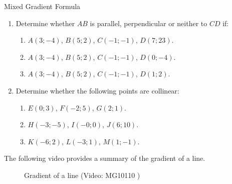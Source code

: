 \begin{exercises}{Mixed Gradient Formula}
 \begin{enumerate}
  \item Determine whether $AB$ is parallel, perpendicular or neither to $CD$ if:
  \begin{enumerate}
   \item $A(3;-4)$, $B(5;2)$, $C(-1;-1)$, $D(7;23)$.
   \item $A(3;-4)$, $B(5;2)$, $C(-1;-1)$, $D(0;-4)$.
   \item $A(3;-4)$, $B(5;2)$, $C(-1;-1)$, $D(1;2)$.
  \end{enumerate}
  
  \item Determine whether the following points are collinear:
  \begin{enumerate}
   \item $E(0;3)$, $F(-2;5)$, $G(2;1)$.
   \item $H(-3;-5)$, $I(-0;0)$, $J(6;10)$.
   \item $K(-6;2)$, $L(-3;1)$, $M(1;-1)$.
  \end{enumerate}
 \end{enumerate}
\end{exercises}

        \label{m39108*eip-611}The following video provides a summary of the gradient of a line.
    \setcounter{subfigure}{0}
	\begin{figure}[H] %
    \textnormal{Gradient of a line}\vspace{.1in} \nopagebreak
  \label{m39108*yt-media1}\label{m39108*yt-video1}
             { (Video:  MG10110 )}
      \vspace{2pt}
    \vspace{.1in}
 \end{figure}       \par 
      \label{m39108**end}
%     
%     
%     
      \label{m39119*uid43}
